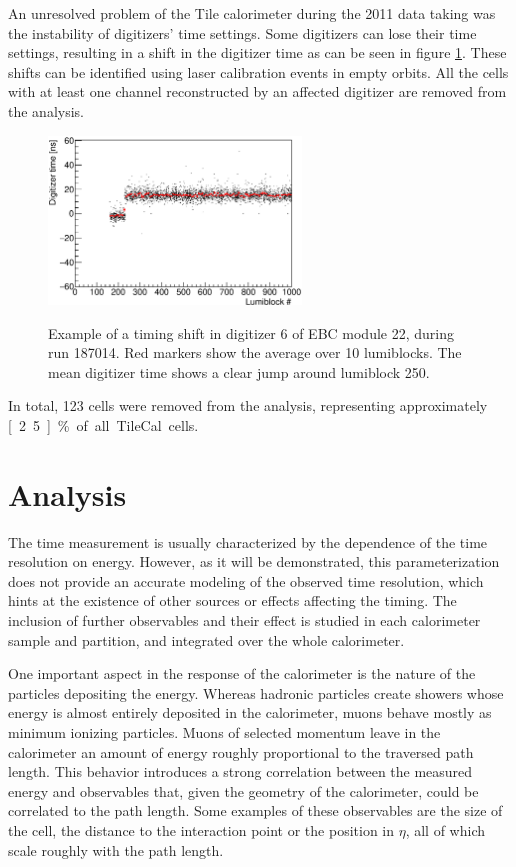 An unresolved problem of the Tile calorimeter during the 2011 data taking was
the instability of digitizers' time settings.
Some digitizers can lose their time settings, resulting in
a shift in the digitizer time as can be seen in figure
\ref{fig:jump}.
These shifts can be identified using laser calibration events in empty orbits.
All the cells with at least one channel reconstructed by an affected digitizer are removed from the analysis.

\begin{figure}[tb!]
  \begin{center}
      \includegraphics[width=0.6\textwidth]{TileTimingPerformance/Figures/jump.eps}
      \label{fig:digi_lumi}
  \end{center}
  \caption{Example of a timing shift in digitizer 6 of EBC module 22,
    during run 187014. Red markers show the average over 10 lumiblocks. The mean digitizer time shows a clear jump around lumiblock 250.}
  \label{fig:jump}
\end{figure}

In total, 123 cells were removed from the analysis,
representing approximately \unit[2.5]{\%} of all TileCal cells.


\section{Analysis}
\label{sec:analysis}
The time measurement is usually characterized by the
dependence of the time resolution on energy.
However, as it will be demonstrated, this parameterization does not provide an accurate modeling of the
observed time resolution, which hints at the existence of other sources or
effects affecting the timing.
The inclusion of further observables and their effect is studied
in each calorimeter sample and partition, and integrated over the
whole calorimeter.

One important aspect in the response of the calorimeter is the nature
of the particles depositing the energy.
Whereas hadronic particles
create showers whose energy is almost entirely deposited in the
calorimeter, muons behave mostly as minimum ionizing particles.
Muons of selected momentum leave in the calorimeter an amount of energy
roughly proportional to the traversed path length.
This behavior
introduces a strong correlation between the measured energy and
observables that, given the geometry of the calorimeter, could be
correlated to the path length.
Some examples of these observables are
the size of the cell, the distance to the interaction point or the
position in $\eta$, all of which scale roughly with the path length.

